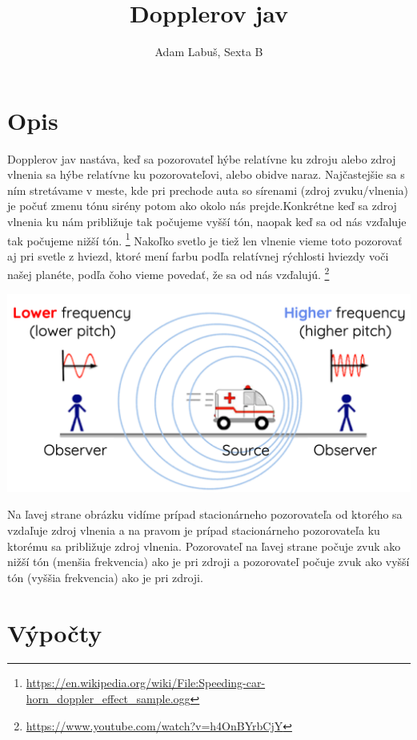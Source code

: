 \documentclass[12pt]{article}
\title{\Huge Dopplerov jav}
\author{Adam Labuš, Sexta B}
\begin{document}
	\maketitle

	\tableofcontents

	\section{Opis}
	Dopplerov jav nastáva, keď sa pozorovateľ hýbe relatívne ku zdroju alebo zdroj vlnenia sa hýbe relatívne ku pozorovateľovi, alebo obidve naraz. 
Najčastejšie sa s ním stretávame v meste, kde pri prechode auta so sírenami (zdroj zvuku/vlnenia) je počuť zmenu tónu sirény potom ako okolo nás prejde.Konkrétne keď sa zdroj vlnenia ku nám približuje tak počujeme vyšší tón, naopak keď sa od nás vzďaluje tak počujeme nižší tón.
	\footnote{\url{https://en.wikipedia.org/wiki/File:Speeding-car-horn_doppler_effect_sample.ogg}}
	Nakoľko svetlo je tiež len vlnenie vieme toto pozorovať aj pri svetle z hviezd, ktoré mení farbu podľa relatívnej rýchlosti hviezdy voči našej planéte, podľa čoho vieme povedať, že sa od nás vzďalujú.
	\footnote{\url{https://www.youtube.com/watch?v=h4OnBYrbCjY}}

	\begin{center}
		\includegraphics[width=.5\textwidth]{simple_explanation}
	\end{center}

	Na ľavej strane obrázku vidíme prípad stacionárneho pozorovateľa od ktorého sa vzdaľuje zdroj vlnenia a na pravom je prípad stacionárneho pozorovateľa ku ktorému sa približuje zdroj vlnenia. Pozorovateľ na ľavej strane počuje zvuk ako nižší tón (menšia frekvencia) ako je pri zdroji a pozorovateľ počuje zvuk ako vyšší tón (vyššia frekvencia) ako je pri zdroji. 

	\newpage
	\section{Výpočty}
\end{document}

